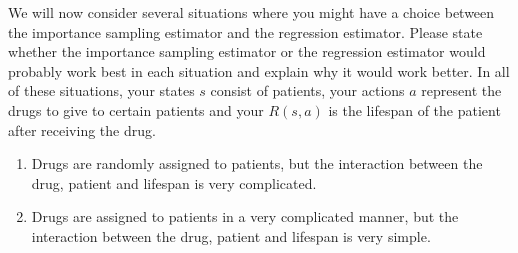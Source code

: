 
\item {} We will now consider several situations where you might have a choice between the importance sampling estimator and the regression estimator. Please state whether the importance sampling estimator or the regression estimator would probably work best in each situation and explain why it would work better. In all of these situations, your states $s$ consist of patients, your actions $a$ represent the drugs to give to certain patients and your $R(s, a)$ is the lifespan of the patient after receiving the drug.

\begin{enumerate}[label=\roman*.]
\item {} Drugs are randomly assigned to patients, but the interaction between the drug, patient and lifespan is very complicated.

\item {} Drugs are assigned to patients in a very complicated manner, but the interaction between the drug, patient and lifespan is very simple.

\end{enumerate}
